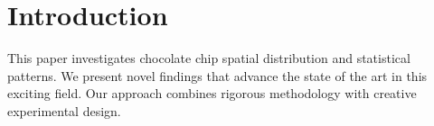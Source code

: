 \section{Introduction}

This paper investigates chocolate chip spatial distribution and statistical patterns. We present novel findings that advance the state of the art in this exciting field. Our approach combines rigorous methodology with creative experimental design.
